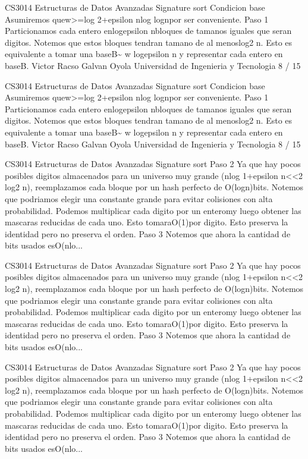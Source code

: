 \begin{description}[leftmargin=!,labelwidth=4.2em,style=nextline]
\item[Pag. 21] CS3014 Estructuras de Datos Avanzadas Signature sort Condicion base Asumiremos quew>=log 2+epsilon nlog lognpor ser conveniente. Paso 1 Particionamos cada entero enlogepsilon nbloques de tamanos iguales que seran digitos. Notemos que estos bloques tendran tamano de al menoslog2 n. Esto es equivalente a tomar una baseB\textasciitilde{} w logepsilon n y representar cada entero en baseB. Victor Racso Galvan Oyola Universidad de Ingenieria y Tecnologia 8 / 15
\item[Pag. 22] CS3014 Estructuras de Datos Avanzadas Signature sort Condicion base Asumiremos quew>=log 2+epsilon nlog lognpor ser conveniente. Paso 1 Particionamos cada entero enlogepsilon nbloques de tamanos iguales que seran digitos. Notemos que estos bloques tendran tamano de al menoslog2 n. Esto es equivalente a tomar una baseB\textasciitilde{} w logepsilon n y representar cada entero en baseB. Victor Racso Galvan Oyola Universidad de Ingenieria y Tecnologia 8 / 15
\item[Pag. 23] CS3014 Estructuras de Datos Avanzadas Signature sort Paso 2 Ya que hay pocos posibles digitos almacenados para un universo muy grande (nlog 1+epsilon n<<2 log2 n), reemplazamos cada bloque por un hash perfecto de O(logn)bits. Notemos que podriamos elegir una constante grande para evitar colisiones con alta probabilidad. Podemos multiplicar cada digito por un enteromy luego obtener las mascaras reducidas de cada uno. Esto tomaraO(1)por digito. Esto preserva la identidad pero no preserva el orden. Paso 3 Notemos que ahora la cantidad de bits usados esO(nlo...
\item[Pag. 24] CS3014 Estructuras de Datos Avanzadas Signature sort Paso 2 Ya que hay pocos posibles digitos almacenados para un universo muy grande (nlog 1+epsilon n<<2 log2 n), reemplazamos cada bloque por un hash perfecto de O(logn)bits. Notemos que podriamos elegir una constante grande para evitar colisiones con alta probabilidad. Podemos multiplicar cada digito por un enteromy luego obtener las mascaras reducidas de cada uno. Esto tomaraO(1)por digito. Esto preserva la identidad pero no preserva el orden. Paso 3 Notemos que ahora la cantidad de bits usados esO(nlo...
\item[Pag. 25] CS3014 Estructuras de Datos Avanzadas Signature sort Paso 2 Ya que hay pocos posibles digitos almacenados para un universo muy grande (nlog 1+epsilon n<<2 log2 n), reemplazamos cada bloque por un hash perfecto de O(logn)bits. Notemos que podriamos elegir una constante grande para evitar colisiones con alta probabilidad. Podemos multiplicar cada digito por un enteromy luego obtener las mascaras reducidas de cada uno. Esto tomaraO(1)por digito. Esto preserva la identidad pero no preserva el orden. Paso 3 Notemos que ahora la cantidad de bits usados esO(nlo...

\end{description}
